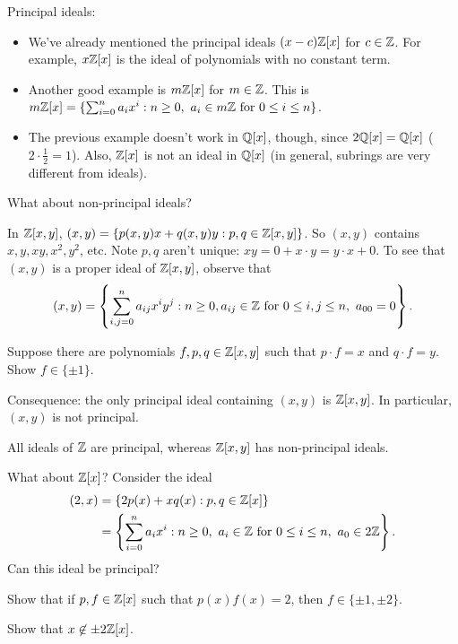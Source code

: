 \documentclass[12pt,letterpaper]{report}
\begin{document}
Principal ideals:
\begin{itemize}
  \item
  We've already mentioned the principal ideals $(x - c)\mathbb{Z}[x]$ for $c \in \mathbb{Z}$.
  For example, $x\mathbb{Z}[x]$ is the ideal of polynomials with no constant term.
  \item
  Another good example is $m\mathbb{Z}[x]$ for $m \in \mathbb{Z}$.
  This is
  $m\mathbb{Z}[x] = \{\sum_{i = 0}^n a_i x^i : n \geq 0, \ a_i \in m\mathbb{Z} \text{ for } 0 \leq i \leq n\}$.
  \item
  The previous example doesn't work in $\mathbb{Q}[x]$, though, since $2\mathbb{Q}[x] = \mathbb{Q}[x]$
  ($2 \cdot \frac{1}{2} = 1$).
  Also, $\mathbb{Z}[x]$ is not an ideal in $\mathbb{Q}[x]$ (in general, subrings are very different from ideals).
\end{itemize}

What about non-principal ideals?

In $\mathbb{Z}[x, y]$, $(x, y) = \{p(x, y)x + q(x, y)y : p, q \in \mathbb{Z}[x, y]\}$.
So $(x, y)$ contains $x, y, xy, x^2, y^2$, etc.
Note $p, q$ aren't unique: $xy = 0 + x \cdot y = y \cdot x + 0$.
To see that $(x, y)$ is a proper ideal of $\mathbb{Z}[x, y]$, observe that
\[ (x, y) = \left\{
  \sum_{i, j = 0}^n a_{ij} x^i y^j : n \geq 0, a_{ij} \in \mathbb{Z} \text{ for } 0 \leq i, j \leq n,
    \ a_{00} = 0
\right\}. \]

\begin{exer}{}{}
  Suppose there are polynomials $f, p, q \in \mathbb{Z}[x, y]$ such that $p \cdot f = x$ and
  $q \cdot f = y$.
  Show $f \in \{\pm 1\}$.
\end{exer}

Consequence: the only principal ideal containing $(x, y)$ is $\mathbb{Z}[x, y]$.
In particular, $(x, y)$ is not principal.

All ideals of $\mathbb{Z}$ are principal, whereas $\mathbb{Z}[x, y]$ has non-principal ideals.

What about $\mathbb{Z}[x]$?
Consider the ideal
\begin{align*}
  (2, x) &= \{2p(x) + xq(x) : p, q \in \mathbb{Z}[x]\} \\
  &= \left\{ \sum_{i = 0}^n a_i x^i : n \geq 0, \ a_i \in \mathbb{Z} \text{ for } 0 \leq i \leq n,
    \ a_0 \in 2\mathbb{Z} \right\}.
\end{align*}
Can this ideal be principal?

\begin{exer}{}{}
  Show that if $p, f \in \mathbb{Z}[x]$ such that $p(x)f(x) = 2$, then $f \in \{\pm 1, \pm 2\}$.

  Show that $x \not\in \pm 2\mathbb{Z}[x]$.
\end{exer}
\end{document}
